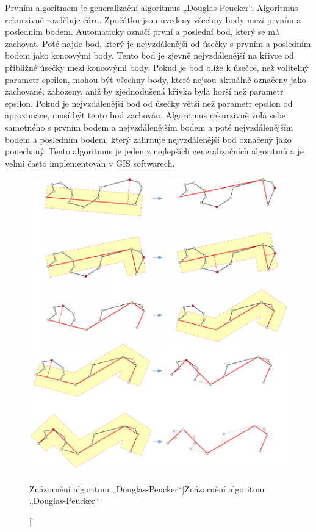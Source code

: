 Prvním algoritmem je generalizační algoritmus „Douglas-Peucker“. Algoritmus rekurzivně rozděluje čáru.
Zpočátku jsou uvedeny všechny body mezi prvním a posledním bodem. Automaticky označí první a poslední bod,
který se má zachovat. Poté najde bod, který je nejvzdálenější od úsečky s prvním a posledním bodem 
jako koncovými body. Tento bod je zjevně nejvzdálenější na křivce od přibližné úsečky mezi koncovými body. 
Pokud je bod blíže k úsečce, než volitelný parametr epsilon, mohou být všechny body, které nejsou aktuálně označeny jako zachované,
zahozeny, aniž by zjednodušená křivka byla horší než parametr epsilon. Pokud je nejvzdálenější bod od úsečky větší než parametr epsilon od aproximace,
musí být tento bod zachován. Algoritmus rekurzivně volá sebe samotného s prvním bodem a nejvzdálenějším bodem 
a poté nejvzdálenějším bodem a posledním bodem, který zahrnuje nejvzdálenější bod označený jako ponechaný.
Tento algoritmus je jeden z nejlepších generalizačních algoritmů a je velmi často
implementován v GIS softwarech. \cite{bayer-douglas}

\begin{figure}[H] \centering
    \includegraphics[width=400pt]{./pictures/douglas.png}
    \caption[Znázornění algoritmu „Douglas-Peucker“]{Znázornění algoritmu „Douglas-Peucker“ \cite{bayer-douglas}}
	\label{fig:douglas}              
\end{figure} 

